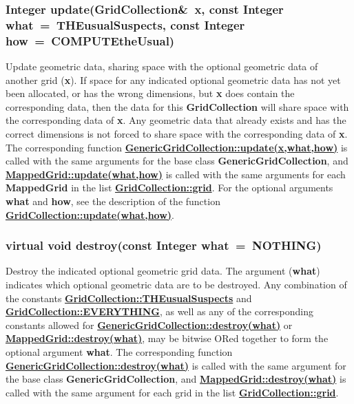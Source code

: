 \documentclass{article}
\begin{document}
  \subsubsection{Integer update(GridCollection\&~x, const Integer what~=~THEusualSuspects, const Integer how~=~COMPUTEtheUsual)}
  \label{GridCollection::update(x,what,how)}
    Update geometric data, sharing space with the optional geometric data of another grid (\textbf{x}).
    If space for any indicated optional geometric data has not yet been allocated, or has
    the wrong dimensions, but \textbf{x} does contain the corresponding data, then the data
    for this \textbf{GridCollection} will share space with the corresponding data of \textbf{x}.
    Any geometric data that already exists and has the correct dimensions
    is not forced to share space with the corresponding data of \textbf{x}.
    The corresponding function
    {\bf{}\hyperref{update(x,what,how)}{update(x,what,how) \rm(\S}{)}{GenericGridCollection::update(x,what,how)}}
    is called with the same arguments for the base class \textbf{GenericGridCollection}, and
    {\bf{}\hyperref{update(what,how)}{update(what,how) \rm(\S}{)}{MappedGrid::update(what,how)}}
    is called with the same arguments for each \textbf{MappedGrid} in the list
    {\bf{}\hyperref{grid}{grid \rm(\S}{)}{GridCollection::grid}}.
    For the optional arguments \textbf{what} and \textbf{how}, see the description of the function
    {\bf{}\hyperref{update(what,how)}{update(what,how) \rm(\S}{)}{GridCollection::update(what,how)}}.

  \subsubsection{virtual void destroy(const Integer what~=~NOTHING)}
  \label{GridCollection::destroy(what)}
    Destroy the indicated optional geometric grid data.
    The argument (\textbf{what}) indicates which optional
    geometric data are to be destroyed.  Any combination of the constants
    {\bf{}\hyperref{THEusualSuspects}{THEusualSuspects \rm(\S}{)}{GridCollection::THEusualSuspects}} and
    {\bf{}\hyperref{EVERYTHING}{EVERYTHING \rm(\S}{)}{GridCollection::EVERYTHING}},
    as well as any of the corresponding constants allowed for
    {\bf{}\hyperref{GenericGridCollection::destroy(what)}{GenericGridCollection::destroy(what) \rm(\S}{)}{GenericGridCollection::destroy(what)}} or
    {\bf{}\hyperref{MappedGrid::destroy(what)}{MappedGrid::destroy(what) \rm(\S}{)}{MappedGrid::destroy(what)}},
    may be bitwise ORed together to form the optional argument \textbf{what}.
    The corresponding function
    {\bf{}\hyperref{destroy(what)}{destroy(what) \rm(\S}{)}{GenericGridCollection::destroy(what)}}
    is called with the same argument for the base class \textbf{GenericGridCollection}, and
    {\bf{}\hyperref{destroy(what)}{destroy(what) \rm(\S}{)}{MappedGrid::destroy(what)}}
    is called with the same argument for each grid in the list
    {\bf{}\hyperref{grid}{grid \rm(\S}{)}{GridCollection::grid}}.
\end{document}
